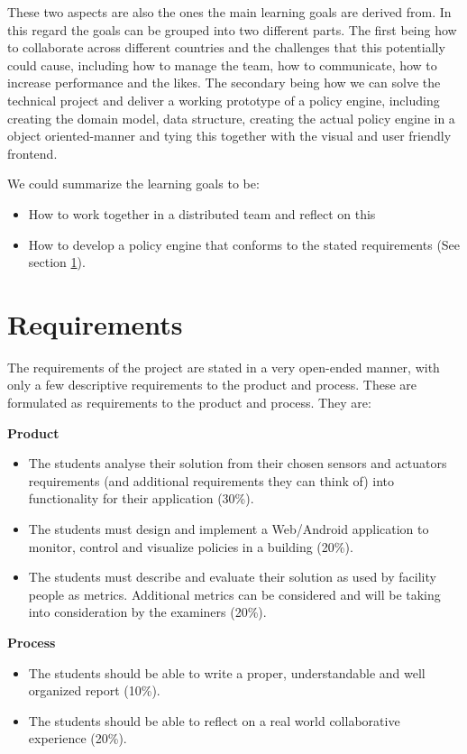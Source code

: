 These two aspects are also the ones the main learning goals are derived from. In this regard the goals can be grouped into two different parts. The first being how to collaborate across different countries and the challenges that this potentially could cause, including how to manage the team, how to communicate, how to increase performance and the likes. The secondary being how we can solve the technical project and deliver a working prototype of a policy engine, including creating the domain model, data structure, creating the actual policy engine in a object oriented-manner and tying this together with the visual and user friendly frontend.

We could summarize the learning goals to be: 
\begin{itemize}
\item How to work together in a distributed team and reflect on this
\item How to develop a policy engine that conforms to the stated requirements (See section \ref{sec:requirements}).
\end{itemize}

\section{Requirements} \label{sec:requirements}
The requirements of the project are stated in a very open-ended manner, with only a few descriptive requirements to the product and process. These are formulated as requirements to the product and process. They are:

\textbf{Product}
\begin{itemize}
	\item The students analyse their solution from their chosen sensors and actuators requirements (and additional requirements they can think of) into functionality for their application (30\%).
	\item The students must design and implement a Web/Android application to monitor, control and visualize policies in a building (20\%).
	\item The students must describe and evaluate their solution as used by facility people as metrics. Additional metrics can be considered and will be taking into consideration by the examiners (20\%).
\end{itemize}

\textbf{Process}
\begin{itemize}
	\item The students should be able to write a proper, understandable and well organized report (10\%).
	\item The students should be able to reflect on a real world collaborative experience (20\%).
\end{itemize}